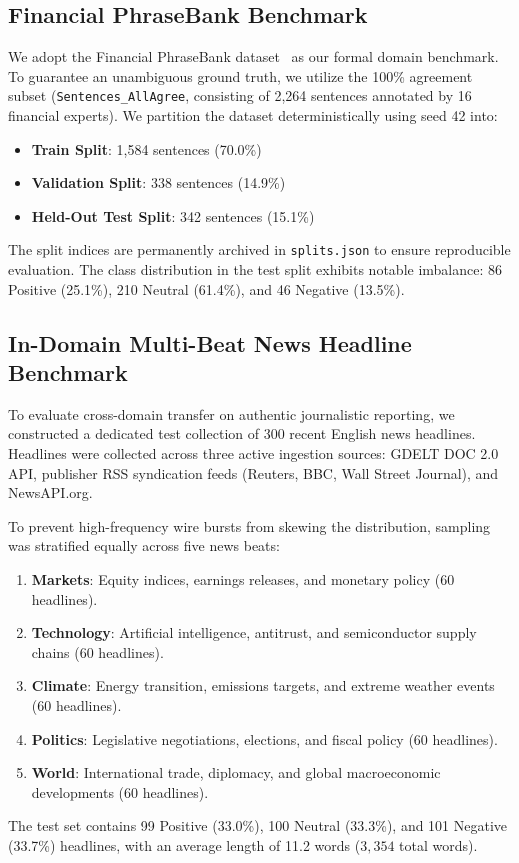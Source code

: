 \documentclass[10pt,twocolumn,letterpaper]{article}
\begin{document}
\subsection{Financial PhraseBank Benchmark}
We adopt the Financial PhraseBank dataset~\cite{malo2014good} as our formal domain benchmark. To guarantee an unambiguous ground truth, we utilize the 100\% agreement subset (\texttt{Sentences\_AllAgree}, consisting of 2,264 sentences annotated by 16 financial experts). We partition the dataset deterministically using seed 42 into:
\begin{itemize}
    \item \textbf{Train Split}: 1,584 sentences (70.0\%)
    \item \textbf{Validation Split}: 338 sentences (14.9\%)
    \item \textbf{Held-Out Test Split}: 342 sentences (15.1\%)
\end{itemize}
The split indices are permanently archived in \texttt{splits.json} to ensure reproducible evaluation. The class distribution in the test split exhibits notable imbalance: 86 Positive (25.1\%), 210 Neutral (61.4\%), and 46 Negative (13.5\%).

\subsection{In-Domain Multi-Beat News Headline Benchmark}
To evaluate cross-domain transfer on authentic journalistic reporting, we constructed a dedicated test collection of 300 recent English news headlines. Headlines were collected across three active ingestion sources: GDELT DOC 2.0 API, publisher RSS syndication feeds (Reuters, BBC, Wall Street Journal), and NewsAPI.org.

To prevent high-frequency wire bursts from skewing the distribution, sampling was stratified equally across five news beats:
\begin{enumerate}
    \item \textbf{Markets}: Equity indices, earnings releases, and monetary policy (60 headlines).
    \item \textbf{Technology}: Artificial intelligence, antitrust, and semiconductor supply chains (60 headlines).
    \item \textbf{Climate}: Energy transition, emissions targets, and extreme weather events (60 headlines).
    \item \textbf{Politics}: Legislative negotiations, elections, and fiscal policy (60 headlines).
    \item \textbf{World}: International trade, diplomacy, and global macroeconomic developments (60 headlines).
\end{enumerate}
The test set contains 99 Positive (33.0\%), 100 Neutral (33.3\%), and 101 Negative (33.7\%) headlines, with an average length of 11.2 words ($3,354$ total words).
\end{document}
